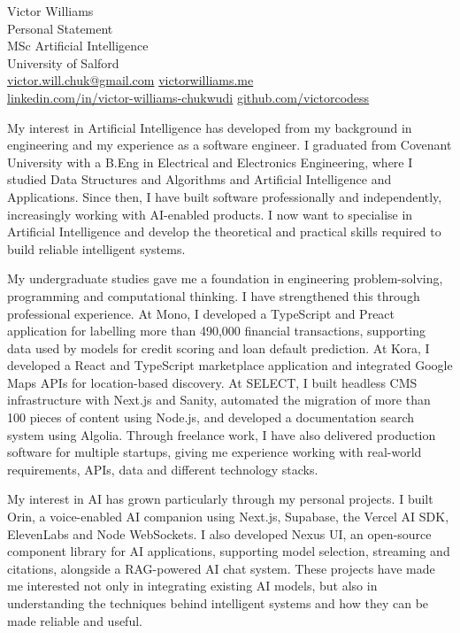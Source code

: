 \documentclass[11pt,a4paper]{article}
\begin{document}
\begin{center}
{\Large Victor Williams}\\[0.4em]
Personal Statement\\[0.15em]
MSc Artificial Intelligence\\
University of Salford\\[0.4em]
{\small
\href{mailto:victor.will.chuk@gmail.com}{victor.will.chuk@gmail.com}
\quad
\href{https://www.victorwilliams.me/}{victorwilliams.me}\\[0.15em]
\href{https://www.linkedin.com/in/victor-williams-chukwudi/}{linkedin.com/in/victor-williams-chukwudi}
\quad
\href{https://github.com/victorcodess}{github.com/victorcodess}
}
\end{center}

\vspace{0.2em}

My interest in Artificial Intelligence has developed from my background in engineering and my experience as a software engineer. I graduated from Covenant University with a B.Eng in Electrical and Electronics Engineering, where I studied Data Structures and Algorithms and Artificial Intelligence and Applications. Since then, I have built software professionally and independently, increasingly working with AI-enabled products. I now want to specialise in Artificial Intelligence and develop the theoretical and practical skills required to build reliable intelligent systems.

My undergraduate studies gave me a foundation in engineering problem-solving, programming and computational thinking. I have strengthened this through professional experience. At Mono, I developed a TypeScript and Preact application for labelling more than 490,000 financial transactions, supporting data used by models for credit scoring and loan default prediction. At Kora, I developed a React and TypeScript marketplace application and integrated Google Maps APIs for location-based discovery. At SELECT, I built headless CMS infrastructure with Next.js and Sanity, automated the migration of more than 100 pieces of content using Node.js, and developed a documentation search system using Algolia. Through freelance work, I have also delivered production software for multiple startups, giving me experience working with real-world requirements, APIs, data and different technology stacks.

My interest in AI has grown particularly through my personal projects. I built Orin, a voice-enabled AI companion using Next.js, Supabase, the Vercel AI SDK, ElevenLabs and Node WebSockets. I also developed Nexus UI, an open-source component library for AI applications, supporting model selection, streaming and citations, alongside a RAG-powered AI chat system. These projects have made me interested not only in integrating existing AI models, but also in understanding the techniques behind intelligent systems and how they can be made reliable and useful.
\end{document}
